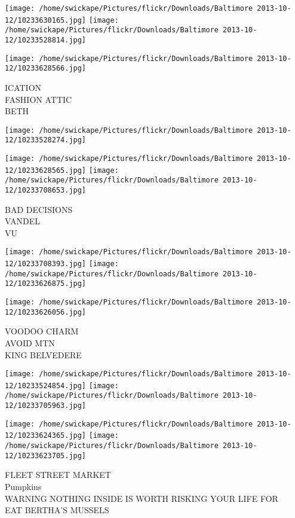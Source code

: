 \documentclass[10pt,letterpaper]{article}
\begin{document}
\texttt{[image: /home/swickape/Pictures/flickr/Downloads/Baltimore 2013-10-12/10233630165.jpg]}
\texttt{[image: /home/swickape/Pictures/flickr/Downloads/Baltimore 2013-10-12/10233528814.jpg]}

\vspace{0.25in}
\texttt{[image: /home/swickape/Pictures/flickr/Downloads/Baltimore 2013-10-12/10233628566.jpg]}

ICATION\\
FASHION ATTIC\\
BETH
\pagebreak

\texttt{[image: /home/swickape/Pictures/flickr/Downloads/Baltimore 2013-10-12/10233528274.jpg]}

\vspace{0.25in}
\texttt{[image: /home/swickape/Pictures/flickr/Downloads/Baltimore 2013-10-12/10233628565.jpg]}
\texttt{[image: /home/swickape/Pictures/flickr/Downloads/Baltimore 2013-10-12/10233708653.jpg]}

BAD DECISIONS\\
VANDEL\\
VU
\pagebreak

\texttt{[image: /home/swickape/Pictures/flickr/Downloads/Baltimore 2013-10-12/10233708393.jpg]}
\texttt{[image: /home/swickape/Pictures/flickr/Downloads/Baltimore 2013-10-12/10233626875.jpg]}

\vspace{0.25in}
\texttt{[image: /home/swickape/Pictures/flickr/Downloads/Baltimore 2013-10-12/10233626056.jpg]}

VOODOO CHARM\\
AVOID MTN\\
KING BELVEDERE
\pagebreak

\texttt{[image: /home/swickape/Pictures/flickr/Downloads/Baltimore 2013-10-12/10233524854.jpg]}
\texttt{[image: /home/swickape/Pictures/flickr/Downloads/Baltimore 2013-10-12/10233705963.jpg]}

\texttt{[image: /home/swickape/Pictures/flickr/Downloads/Baltimore 2013-10-12/10233624365.jpg]}
\texttt{[image: /home/swickape/Pictures/flickr/Downloads/Baltimore 2013-10-12/10233623705.jpg]}

FLEET STREET MARKET\\
Pumpkins\\
WARNING NOTHING INSIDE IS WORTH RISKING YOUR LIFE FOR\\
EAT BERTHA'S MUSSELS
\pagebreak
\end{document}
